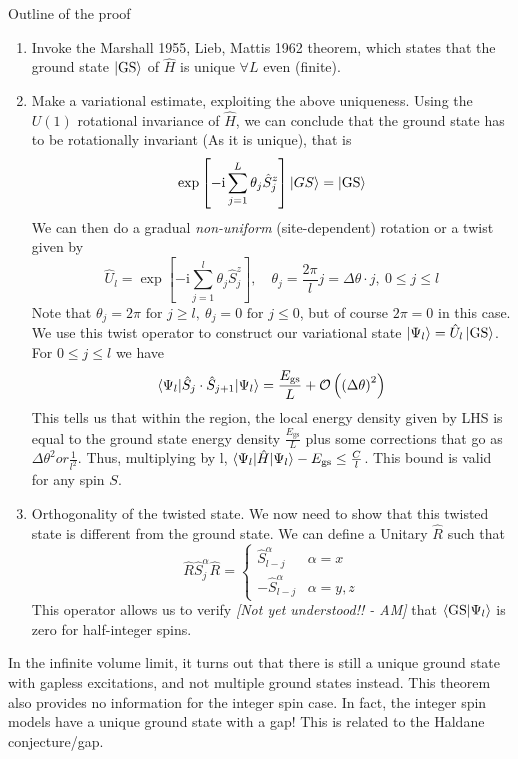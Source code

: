 \documentclass{article}
\newcommand\AM[1]{{\it \color{darkblue}  [#1 - AM]}}
\renewcommand{\i}{\mathrm{i}}
\renewcommand{\i}{\mathrm{i}}
\begin{document}
Outline of the proof
\begin{enumerate}
    \item Invoke the Marshall 1955, Lieb, Mattis 1962 theorem, which states that the ground state $\ket{\text{GS}}$ of $\hat{H}$ is unique $\forall L$ even (finite).
    \item Make a variational estimate, exploiting the above uniqueness. Using the $U(1)$ rotational invariance of $\hat{H}$, we can conclude that the ground state has to be rotationally invariant (As it is unique), that is
    \begin{equation}
        \exp{\left[-\i \sum^{L}_{j=1} \theta_j \hat{S}^z_j\right]} \ket{GS} = \ket{\text{GS}}
    \end{equation}
    We can then do a gradual \emph{non-uniform} (site-dependent) rotation or a twist given by
    \begin{equation}
        \hat{U}_l = \exp{\left[-\i \sum^{l}_{j=1} \theta_j \hat{S}^z_j\right]}, \quad \theta_j = \frac{2\pi}{l} j= \Delta\theta\cdot j ,~ 0\leq j \leq l
    \end{equation}
    Note that $\theta_j = 2\pi \text{ for }  j \geq l,~ \theta_j = 0 \text{ for } j\leq 0$, but of course $2\pi = 0$ in this case.
    We use this twist operator to construct our variational state $\ket{\Psi_l} = \hat{U}_l\ket{\text{GS}}$. For $0 \leq j \leq l$ we have
    \begin{equation}
        \braket{\Psi_l| \hat{S}_j \cdot \hat{S}_{j+1}| \Psi_l} = \frac{E_{\text{gs}}}{L} + \mathcal{O}\left(\left(\Delta \theta\right)^2\right)
    \end{equation}
    This tells us that within the region, the local energy density given by LHS is equal to the ground state energy density $\frac{E_{\text{gs}}}{L}$ plus some corrections that go as $\Delta \theta ^2 or \frac{1}{l^2}$. Thus, multiplying by l, $\braket{\Psi_l | \hat{H} | \Psi_l} - E_{\text{gs}} \leq \frac{C}{l}$. This bound is valid for any spin $S$.
    \item Orthogonality of the twisted state.
    We now need to show that this twisted state is different from the ground state.
    We can define a Unitary $\hat{R}$ such that
    \begin{equation}
       \hat{R}\hat{S}^\alpha_j\hat{R} = \begin{cases}
           \hat{S}^\alpha_{l-j} & \alpha = x \\
           -\hat{S}^\alpha_{l-j} & \alpha = y, z
       \end{cases}     
    \end{equation}
    This operator allows us to verify \AM{Not yet understood!!} that $\braket{\text{GS}|\Psi_l}$ is zero for half-integer spins.
\end{enumerate}
In the infinite volume limit, it turns out that there is still a unique ground state with gapless excitations, and not multiple ground states instead.
This theorem also provides no information for the integer spin case. In fact, the integer spin models have a unique ground state with a gap! This is related to the Haldane conjecture/gap.
\end{document}
